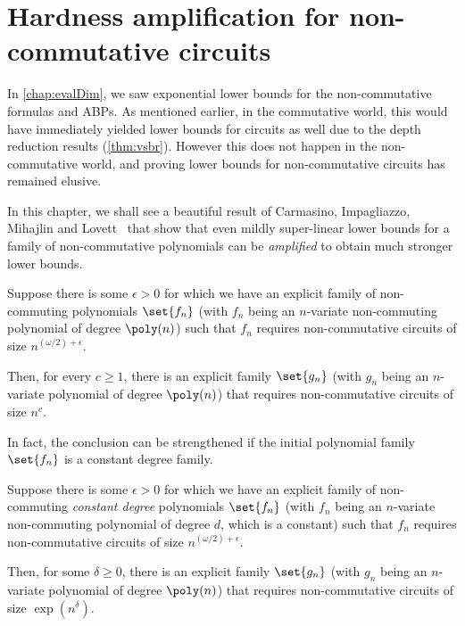 \chapter{Hardness amplification for non-commutative circuits}
\label{chap:nc-hardness-amp}

In \autoref{chap:evalDim}, we saw exponential lower bounds for the non-commutative formulas and ABPs. As mentioned earlier, in the commutative world, this would have immediately yielded lower bounds for circuits as well due to the depth reduction results (\autoref{thm:vsbr}). However this does not happen in the non-commutative world, and proving lower bounds for non-commutative circuits has remained elusive.

In this chapter, we shall see a beautiful result of Carmasino, Impagliazzo, Mihajlin and Lovett~\cite{CILM18} that show that even mildly super-linear lower bounds for a family of non-commutative polynomials can be \emph{amplified} to obtain much stronger lower bounds.

\begin{theorem} \label{thm:CILM18-mainthm}
  Suppose there is some $\epsilon > 0$ for which we have an explicit family of non-commuting polynomials $\set{f_n}$ (with $f_n$ being an $n$-variate non-commuting polynomial of degree $\poly(n)$) such that $f_n$ requires non-commutative circuits of size $n^{(\omega/2) + \epsilon}$.

  Then, for every $c \geq 1$, there is an explicit family $\set{g_n}$ (with $g_n$ being an $n$-variate polynomial of degree $\poly(n)$) that requires non-commutative circuits of size $n^c$. 
\end{theorem}

In fact, the conclusion can be strengthened if the initial polynomial family $\set{f_n}$ is a constant degree family.

\begin{theorem} \label{thm:CILM18-mainthm-constdeg}
  Suppose there is some $\epsilon > 0$ for which we have an explicit family of non-commuting \emph{constant degree} polynomials $\set{f_n}$ (with $f_n$ being an $n$-variate non-commuting polynomial of degree $d$, which is a constant) such that $f_n$ requires non-commutative circuits of size $n^{(\omega/2) + \epsilon}$.

  Then, for some $\delta \geq 0$, there is an explicit family $\set{g_n}$ (with $g_n$ being an $n$-variate polynomial of degree $\poly(n)$) that requires non-commutative circuits of size $\exp(n^{\delta})$. 
\end{theorem}

